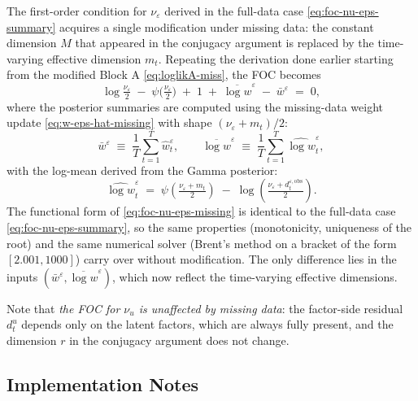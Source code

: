 \documentclass[11pt, a4paper, oneside]{article}
\begin{document}
The first-order condition for $\nu_\varepsilon$ derived in the
full-data case \eqref{eq:foc-nu-eps-summary} acquires a single
modification under missing data: the constant dimension $M$ that
appeared in the conjugacy argument is replaced by the time-varying
effective dimension $m_t$. Repeating the derivation done earlier starting from the modified Block A
\eqref{eq:loglikA-miss}, the FOC becomes
\begin{equation}
\boxed{\;\;
\log\!\tfrac{\nu_\varepsilon}{2} \;-\; \psi\!\big(\tfrac{\nu_\varepsilon}{2}\big) \;+\; 1 \;+\; \overline{\log w}^{\varepsilon} \;-\; \bar{w}^{\varepsilon} \;=\; 0,
\;\;}
\label{eq:foc-nu-eps-missing}
\end{equation}
where the posterior summaries are computed using the missing-data
weight update \eqref{eq:w-eps-hat-missing} with shape
$(\nu_\varepsilon + m_t)/2$:
\[
\bar{w}^{\varepsilon} \;\equiv\; \frac{1}{T}\sum_{t=1}^T \hat{w}^{\varepsilon}_t,
\qquad
\overline{\log w}^{\varepsilon} \;\equiv\; \frac{1}{T}\sum_{t=1}^T \widehat{\log w}^{\varepsilon}_t,
\]
with the log-mean derived from the Gamma posterior:
\[
\widehat{\log w}^{\varepsilon}_t \;=\; \psi\!\left(\tfrac{\nu_\varepsilon + m_t}{2}\right) \;-\; \log\!\left(\tfrac{\nu_\varepsilon + d^{\varepsilon, \mathrm{obs}}_t}{2}\right).
\]
The functional form of \eqref{eq:foc-nu-eps-missing} is identical to
the full-data case \eqref{eq:foc-nu-eps-summary}, so the same
properties (monotonicity, uniqueness of the root) and the same
numerical solver (Brent's method on a bracket of the form
$[2.001, 1000]$) carry over without modification. The only
difference lies in the inputs $(\bar{w}^\varepsilon, \overline{\log w}^\varepsilon)$,
which now reflect the time-varying effective dimensions.

Note that \emph{the FOC for $\nu_u$ is unaffected by missing data}:
the factor-side residual $d^u_t$ depends only on the latent factors,
which are always fully present, and the dimension $r$ in the
conjugacy argument does not change.

\subsection{Implementation Notes}
\label{subsec:missing-impl}
\end{document}
